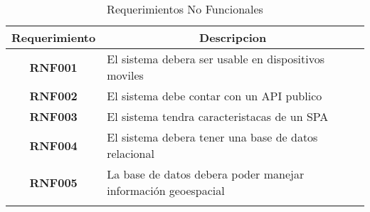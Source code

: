     \begin{longtable}{ c  X }
      \toprule
        \textbf{Requerimiento} &
        \multicolumn{1}{c}{\textbf{Descripcion}}\\

      \midrule
      \endhead

\addlinespace
\textbf{RNF001}
&
El sistema debera ser usable en dispositivos moviles
\\

\addlinespace
\textbf{RNF002}
&
El sistema debe contar con un API publico
\\

\addlinespace
\textbf{RNF003}
&
El sistema tendra caracteristacas de un SPA
\\

\addlinespace
\textbf{RNF004}
&
El sistema debera tener una base de datos relacional
\\

\addlinespace
\textbf{RNF005}
&
La base de datos debera poder manejar información geoespacial
\\




      \bottomrule
      \caption{Requerimientos No Funcionales}
      \label{tab:requerimientos no funcionales}
    \end{longtable}
